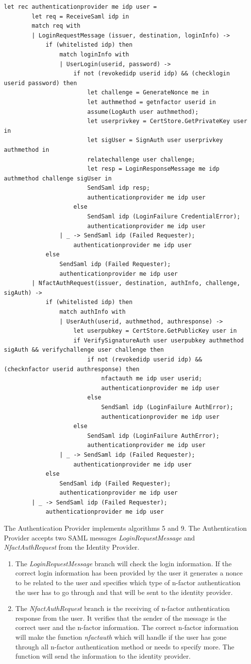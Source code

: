 \documentclass[twosided]{report}
\begin{document}
\begin{lstlisting}[style=fstar, caption={Specification of the authentication provider}]
	let rec authenticationprovider me idp user =
		let req = ReceiveSaml idp in
		match req with
		| LoginRequestMessage (issuer, destination, loginInfo) ->
			if (whitelisted idp) then
				match loginInfo with
				| UserLogin(userid, password) ->
					if not (revokedidp userid idp) && (checklogin userid password) then
						let challenge = GenerateNonce me in
						let authmethod = getnfactor userid in
						assume(LogAuth user authmethod);
						let userprivkey = CertStore.GetPrivateKey user in
						let sigUser = SignAuth user userprivkey authmethod in
						relatechallenge user challenge;
						let resp = LoginResponseMessage me idp authmethod challenge sigUser in
						SendSaml idp resp;
						authenticationprovider me idp user
					else
						SendSaml idp (LoginFailure CredentialError);
						authenticationprovider me idp user
				| _ -> SendSaml idp (Failed Requester);
					authenticationprovider me idp user
			else
				SendSaml idp (Failed Requester);
				authenticationprovider me idp user
		| NfactAuthRequest(issuer, destination, authInfo, challenge, sigAuth) ->
			if (whitelisted idp) then
				match authInfo with
				| UserAuth(userid, authmethod, authresponse) ->
					let userpubkey = CertStore.GetPublicKey user in
					if VerifySignatureAuth user userpubkey authmethod sigAuth && verifychallenge user challenge then
						if not (revokedidp userid idp) && (checknfactor userid authresponse) then
							nfactauth me idp user userid;
							authenticationprovider me idp user
						else
							SendSaml idp (LoginFailure AuthError);
							authenticationprovider me idp user
					else
						SendSaml idp (LoginFailure AuthError);
						authenticationprovider me idp user
				| _ -> SendSaml idp (Failed Requester);
					authenticationprovider me idp user
			else
				SendSaml idp (Failed Requester);
				authenticationprovider me idp user
		| _ -> SendSaml idp (Failed Requester);
			authenticationprovider me idp user
\end{lstlisting}

The Authentication Provider implements algorithms 5 and 9. The Authentication Provider accepts two SAML messages \emph{LoginRequestMessage} and \emph{NfactAuthRequest} from the Identity Provider.
\begin{enumerate}
\item The \emph{LoginRequestMessage} branch will check the login information. If the correct login information has been provided by the user it generates a nonce to be related to the user and specifies which type of n-factor authentication the user has to go through and that will be sent to the identity provider.
\item The \emph{NfactAuthRequest} branch is the receiving of n-factor authentication response from the user. It verifies that the sender of the message is the correct user and the n-factor information. The correct n-factor information will make the function \emph{nfactauth} which will handle if the user has gone through all n-factor authentication method or needs to specify more. The function will send the information to the identity provider.
\end{enumerate}
\end{document}

